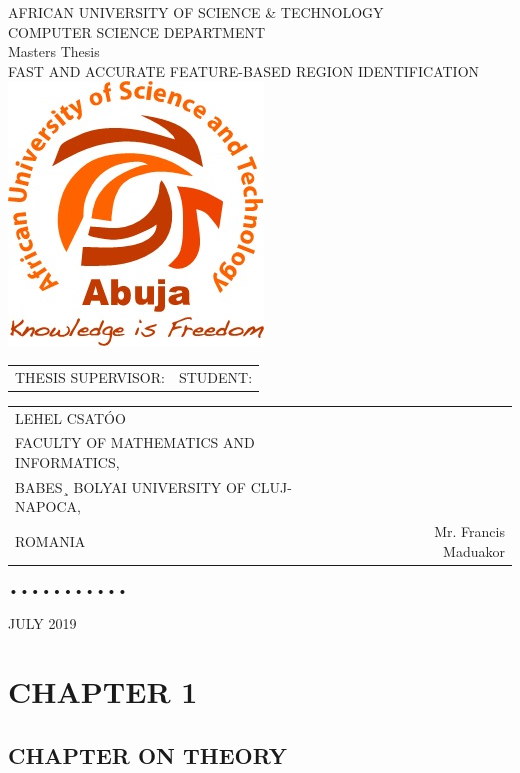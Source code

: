 \documentclass{article}
\begin{document}
\begin{center}
AFRICAN UNIVERSITY OF SCIENCE \& TECHNOLOGY \\
COMPUTER SCIENCE DEPARTMENT \\
Masters Thesis \\
FAST AND ACCURATE FEATURE-BASED REGION IDENTIFICATION\\
\includegraphics{images/logo.jpg}
\end{center}

\noindent
\begin{tabular}{lr}
THESIS SUPERVISOR:	&      STUDENT: 
\end{tabular}

\begin{tabular}{lr}
LEHEL CSATÓO\\ 
FACULTY OF MATHEMATICS AND INFORMATICS,\\
BABES¸ BOLYAI UNIVERSITY OF CLUJ-NAPOCA,\\
ROMANIA
&
Mr. Francis Maduakor
\end{tabular}
•••••••••••
\begin{center}
   JULY 2019 
\end{center}

\clearpage 
\tableofcontents
\clearpage

\section{CHAPTER 1}
\subsection{CHAPTER ON THEORY}
\end{document}
